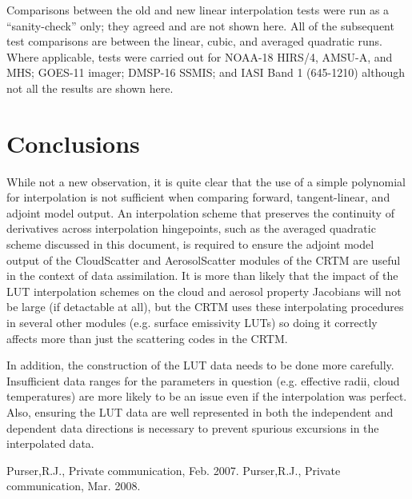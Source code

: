 Comparisons between the old and new linear interpolation tests were run as a ``sanity-check'' only; they agreed and are not shown here. All of the subsequent test comparisons are between the linear, cubic, and averaged quadratic runs. Where applicable, tests were carried out for NOAA-18 HIRS/4, AMSU-A, and MHS; GOES-11 imager;  DMSP-16 SSMIS; and IASI Band 1 (645-1210\invcm) although not all the results are shown here. 









\section{Conclusions}
While not a new observation, it is quite clear that the use of a simple polynomial for interpolation is not sufficient when comparing forward, tangent-linear, and adjoint model output. An interpolation scheme that preserves the continuity of derivatives across interpolation hingepoints, such as the averaged quadratic scheme discussed in this document, is required to ensure the adjoint model output of the CloudScatter and AerosolScatter modules of the CRTM are useful in the context of data assimilation. It is more than likely that the impact of the LUT interpolation schemes on the cloud and aerosol property Jacobians will not be large (if detactable at all), but the CRTM uses these interpolating procedures in several other modules (e.g. surface emissivity LUTs) so doing it correctly affects more than just the scattering codes in the CRTM.

In addition, the construction of the LUT data needs to be done more carefully. Insufficient data ranges for the parameters in question (e.g. effective radii, cloud temperatures) are more likely to be an issue even if the interpolation was perfect. Also, ensuring the LUT data are well represented in both the independent and dependent data directions is necessary to prevent spurious excursions in the interpolated data.

\begin{thebibliography}{99}
   Purser,R.J., Private communication, Feb. 2007.
   Purser,R.J., Private communication, Mar. 2008.
\end{thebibliography}


%





